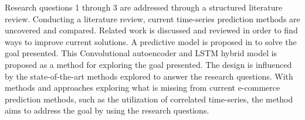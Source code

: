   Research questions 1 through 3 are addressed through a structured literature review.
  Conducting a literature review, current time-series prediction methods are uncovered and compared.
  Related work is discussed and reviewed in order to find ways to improve current solutions.
  A predictive model is proposed in  to solve the goal presented.
  This Convolutional autoencoder and LSTM hybrid model is proposed as a method for exploring the goal presented.
  The design is influenced by the state-of-the-art methods explored to answer the research questions.
  With methods and approaches exploring what is missing from current e-commerce prediction methods,
  such as the utilization of correlated time-series, the method aims to address the goal by using the research questions.
\fi
